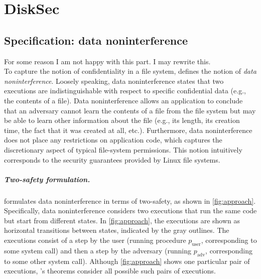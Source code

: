 \chapter{DiskSec}

\section{Specification: data noninterference}
\label{s:spec}

{\color{red} For some reason I am not happy with this part. I may rewrite this. }\\
To capture the notion of confidentiality in a file system, \sys
defines the notion of \emph{data noninterference}.  Loosely speaking,
data noninterference states that two executions are indistinguishable
with respect to specific confidential data (e.g., the contents of
a file).  Data noninterference allows an application to conclude that
an adversary cannot learn the contents of a file from the file system
but may be able to learn other information about the file (e.g., its
length, its creation time, the fact that it was created at all, etc.).
Furthermore, data noninterference does not place any restrictions on
application code, which captures the discretionary aspect of typical
file-system permissions.  This notion intuitively corresponds to the
security guarantees provided by Linux file systems.

%    

\paragraph{Two-safety formulation.}
\sys formulates data noninterference in terms of two-safety, as shown
in \autoref{fig:approach}.  Specifically, data noninterference considers
two executions that run the same code but start from different states.  In
\autoref{fig:approach}, the executions are shown as horizontal transitions
between states, indicated by the gray outlines.  The executions
consist of a step by the user (running procedure $p_\mathrm{user}$,
corresponding to some system call) and then a step by the adversary
(running $p_\mathrm{adv}$, corresponding to some other system call).
Although \autoref{fig:approach} shows one particular pair of executions,
\sys's theorems consider all possible such pairs of executions.

